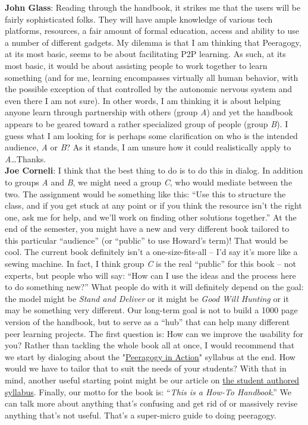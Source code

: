 \textbf{John Glass}: Reading through the handbook, it strikes me that
the users will be fairly sophisticated folks. They will have ample
knowledge of various tech platforms, resources, a fair amount of formal
education, access and ability to use a number of different gadgets. My
dilemma is that I am thinking that Peeragogy, at its most basic, seems
to be about facilitating P2P learning. As such, at its most basic, it
would be about assisting people to work together to learn something (and
for me, learning encompasses virtually all human behavior, with the
possible exception of that controlled by the autonomic nervous system
and even there I am not sure). In other words, I am thinking it is about
helping anyone learn through partnership with others (group \emph{A})
and yet the handbook appears to be geared toward a rather specialized
group of people (group \emph{B}). I guess what I am looking for is
perhaps some clarification on who is the intended audience, \emph{A} or
\emph{B}? As it stands, I am unsure how it could realistically apply to
\emph{A}\ldots{}Thanks. \\

\textbf{Joe Corneli}: I think that the best thing to do is to do this in
dialog. In addition to groups \emph{A} and \emph{B}, we might need a
group \emph{C}, who would mediate between the two. The assignment would
be something like this: ``Use this to structure the class, and if you
get stuck at any point or if you think the resource isn't the right one,
ask me for help, and we'll work on finding other solutions together.''
At the end of the semester, you might have a new and very different book
tailored to this particular ``audience'' (or ``public'' to use Howard's
term)! That would be cool. The current book definitely isn't a
one-size-fits-all -- I'd say it's more like a sewing machine. In fact, I
think group \emph{C} is the real ``public'' for this book -- not
experts, but people who will say: ``How can I use the ideas and the
process here to do something new?'' What people do with it will
definitely depend on the goal: the model might be \emph{Stand and
Deliver} or it might be \emph{Good Will Hunting} or it may be something
very different. Our long-term goal is not to build a 1000 page version
of the handbook, but to serve as a ``hub'' that can help many different
peer learning projects. The first question is: How can we improve the
usability for you? Rather than tackling the whole book all at once, I
would recommend that we start by dialoging about the
"\href{http://peeragogy.org/peeragogy-in-action/}{Peeragogy in Action}"
syllabus at the end. How would we have to tailor that to suit the needs
of your students? With that in mind, another useful starting point might
be our article on
\href{http://peeragogy.org/the-student-authored-syllabus/}{the student
authored syllabus}. Finally, our motto for the book is: ``\emph{This is
a How-To Handbook}.'' We can talk more about anything that's confusing
and get rid of or massively revise anything that's not useful. That's a
super-micro guide to doing peeragogy.

